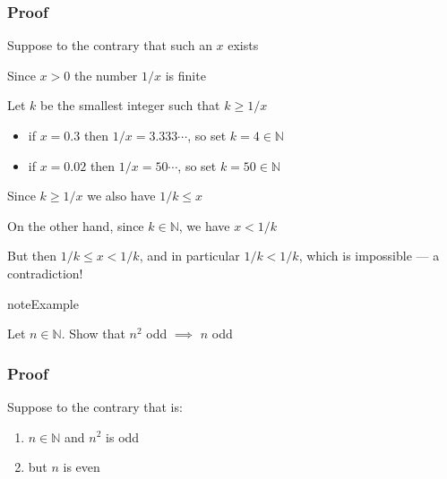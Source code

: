 \documentclass[letterpaper,10pt,english]{jupyterBook}
\begin{document}
\subsubsection*{Proof}

\sphinxAtStartPar
Suppose to the contrary that such an \(x\) exists

\begin{figure}[htbp]
\centering

\noindent{}
\end{figure}

\sphinxAtStartPar
Since \(x > 0\) the number \(1/x\) is finite

\sphinxAtStartPar
Let \(k\) be the smallest integer such that \(k \geq 1/x\)
\begin{itemize}
\item {} 
\sphinxAtStartPar
if \(x = 0.3\) then \(1/x = 3.333\cdots\), so set \(k = 4 \in \mathbb{N}\)

\item {} 
\sphinxAtStartPar
if \(x = 0.02\) then \(1/x = 50\cdots\), so set \(k = 50 \in \mathbb{N}\)

\end{itemize}

\sphinxAtStartPar
Since \(k \geq 1/x\) we also have \(1/k \leq x\)

\sphinxAtStartPar
On the other hand, since \(k \in \mathbb{N}\), we have \(x < 1/k\)

\sphinxAtStartPar
But then \(1/k \leq x < 1/k\), and in particular \(1/k < 1/k\), which is impossible — a contradiction!

\begin{sphinxadmonition}{note}{Example}

\sphinxAtStartPar
Let \(n \in \mathbb{N}\). Show that \(n^2\) odd \(\implies\) \(n\) odd
\end{sphinxadmonition}
\subsubsection*{Proof}

\sphinxAtStartPar
Suppose to the contrary that is:
\begin{enumerate}
%
\item {} 
\sphinxAtStartPar
\(n \in \mathbb{N}\) and \(n^2\) is odd

\item {} 
\sphinxAtStartPar
but \(n\) is even

\end{enumerate}
\end{document}
